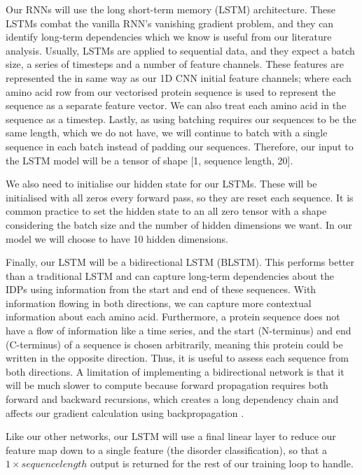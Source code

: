 \documentclass{l4proj}
\begin{document}
Our RNNs will use the long short-term memory (LSTM) architecture. These LSTMs combat the vanilla RNN’s vanishing gradient problem, and they can identify long-term dependencies which we know is useful from our literature analysis. Usually, LSTMs are applied to sequential data, and they expect a batch size, a series of timesteps and a number of feature channels. These features are represented the in same way as our 1D CNN initial feature channels; where each amino acid row from our vectorised protein sequence is used to represent the sequence as a separate feature vector. We can also treat each amino acid in the sequence as a timestep. Lastly, as using batching requires our sequences to be the same length, which we do not have, we will continue to batch with a single sequence in each batch instead of padding our sequences. Therefore, our input to the LSTM model will be a tensor of shape [1, sequence length, 20]. 

We also need to initialise our hidden state for our LSTMs. These will be initialised with all zeros every forward pass, so they are reset each sequence. It is common practice to set the hidden state to an all zero tensor with a shape considering the batch size and the number of hidden dimensions we want. In our model we will choose to have 10 hidden dimensions. 

Finally, our LSTM will be a bidirectional LSTM (BLSTM). This performs better than a traditional LSTM and can capture long-term dependencies about the IDPs using information from the start and end of these sequences. With information flowing in both directions, we can capture more contextual information about each amino acid. Furthermore, a protein sequence does not have a flow of information like a time series, and the start (N-terminus) and end (C-terminus) of a sequence is chosen arbitrarily, meaning this protein could be written in the opposite direction. Thus, it is useful to assess each sequence from both directions. A limitation of implementing a bidirectional network is that it will be much slower to compute because forward propagation requires both forward and backward recursions, which creates a long dependency chain and affects our gradient calculation using backpropagation \citep{Zhang:2021}.  

Like our other networks, our LSTM will use a final linear layer to reduce our feature map down to a single feature (the disorder classification), so that a $1\times sequence length$ output is returned for the rest of our training loop to handle.
\end{document}
